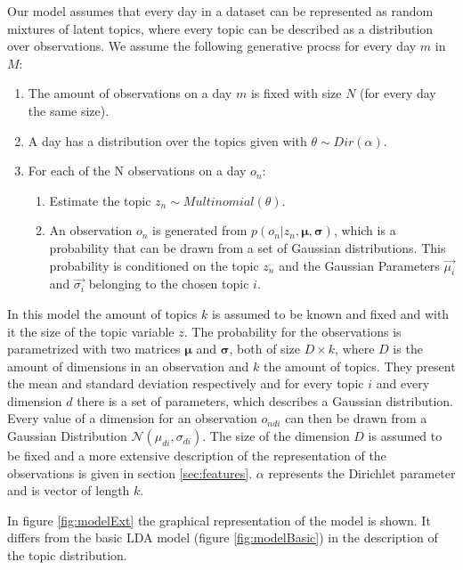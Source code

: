 \documentclass[11pt,a4paper]{article}
\begin{document}
  Our model assumes that every day in a dataset can be represented as random mixtures of latent topics, where every topic can be described as a distribution over observations. We assume the following generative procss for every day $m$ in $M$:
\begin{enumerate}
 \item The amount of observations on a day $m$ is fixed with size $N$ (for every day the same size).
 \item A day has a distribution over the topics given with $\theta \sim Dir(\alpha)$.
 \item For each of the N observations on a day $o_n$:
 
 \begin{enumerate}
  \item Estimate the topic $z_n \sim Multinomial(\theta)$.
  \item An observation $o_n$ is generated from $p(o_n |z_n,\boldsymbol\mu,\boldsymbol\sigma)$,  which is a probability that can be drawn from a set of Gaussian distributions. This probability is conditioned on the topic $z_n$ and the Gaussian Parameters $\vec{\mu_i}$ and $\vec{\sigma_i}$ belonging to the chosen topic $i$.
 \end{enumerate}

\end{enumerate}
  
In this model the amount of topics $k$ is assumed to be known and fixed and with it the size of the topic variable $z$.
The probability for the observations is parametrized with two matrices $\boldsymbol\mu$ and $\boldsymbol\sigma$, both of size $D\times k$, where $D$ is the amount of dimensions in an observation and $k$ the amount of topics. They present the mean and standard deviation respectively and for every topic $i$ and every dimension $d$ there is a set of parameters, which describes a Gaussian distribution. Every value of a dimension for an observation $o_{ndi}$ can then be drawn from a Gaussian Distribution $\mathcal{N}(\mu_{di},\sigma_{di})$.
The size of the dimension $D$ is assumed to be fixed and a more extensive description of the representation of the observations is given in section \ref{sec:features}. $\alpha$ represents the Dirichlet parameter and is vector of length $k$.

In figure \ref{fig:modelExt} the graphical representation of the model is shown. It differs from the basic LDA model (figure \ref{fig:modelBasic}) in the description of the topic distribution.
\end{document}

